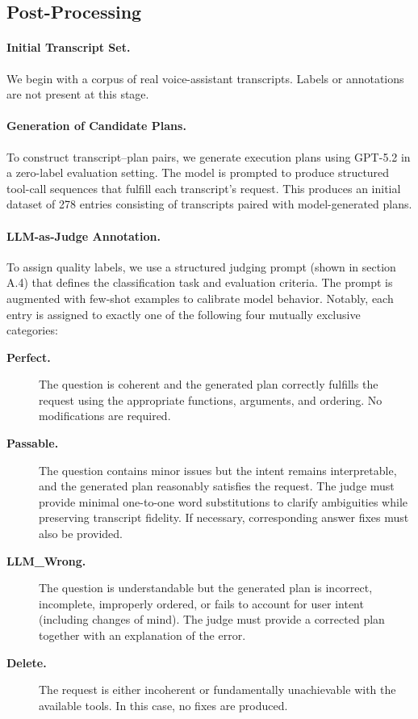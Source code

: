 \subsection{Post-Processing}

\paragraph{Initial Transcript Set.}
We begin with a corpus of real voice-assistant transcripts. Labels or annotations are not present at this stage.

\paragraph{Generation of Candidate Plans.}
To construct transcript--plan pairs, we generate execution plans using GPT-5.2 in a zero-label evaluation setting. The model is prompted to produce structured tool-call sequences that fulfill each transcript’s request. This produces an initial dataset of 278 entries consisting of transcripts paired with model-generated plans.

\paragraph{LLM-as-Judge Annotation.}
To assign quality labels, we use a structured judging prompt (shown in section A.4) that defines the classification task and evaluation criteria. The prompt is augmented with few-shot examples to calibrate model behavior. Notably, each entry is assigned to exactly one of the following four mutually exclusive categories:

\begin{description}

\item[\textbf{Perfect.}] The question is coherent and the generated plan correctly fulfills the request using the appropriate functions, arguments, and ordering. No modifications are required.

\item[\textbf{Passable.}] The question contains minor issues but the intent remains interpretable, and the generated plan reasonably satisfies the request. The judge must provide minimal one-to-one word substitutions to clarify ambiguities while preserving transcript fidelity. If necessary, corresponding answer fixes must also be provided.

\item[\textbf{LLM\_Wrong.}] The question is understandable but the generated plan is incorrect, incomplete, improperly ordered, or fails to account for user intent (including changes of mind). The judge must provide a corrected plan together with an explanation of the error.

\item[\textbf{Delete.}] The request is either incoherent or fundamentally unachievable with the available tools. In this case, no fixes are produced.

\end{description}

